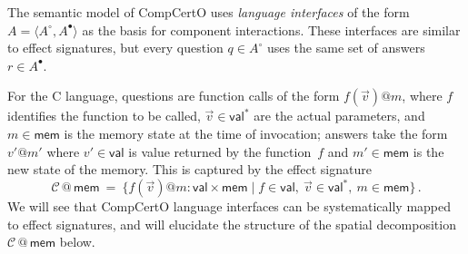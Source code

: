 \documentclass[acmsmall,screen,review,anonymous,nonacm]{acmart}
\newcommand{\kw}[1]{\ensuremath{ \mathsf{#1} }}
\begin{document}
\begin{example} \label{ex:compcertosig} %
The semantic model of CompCertO uses \emph{language interfaces}
of the form $A = \langle A^\circ, A^\bullet \rangle$
as the basis for component interactions.
These interfaces are similar to effect signatures,
but every question $q \in A^\circ$ uses the same set of answers $r \in A^\bullet$.

For the C language,
questions are function calls of the form $f(\vec{v})@m$, where
$f$ identifies the function to be called,
$\vec{v} \in \kw{val}^*$ are the actual parameters, and
$m \in \kw{mem}$ is the memory state at the time of invocation;
answers take the form $v'@m'$ where
$v' \in \kw{val}$ is value returned by the function~$f$ and
$m' \in \kw{mem}$ is the new state of the memory.
This is captured by the effect signature
\[
  \mathcal{C} \mathbin@ \kw{mem} \:=\:
  \{ f(\vec{v})@m \mathbin: \kw{val} \times \kw{mem} \mid
     f \in \kw{val}, \:
     \vec{v} \in \kw{val}^*, \:
     m \in \kw{mem} \}
  \,.
\]
We will see that CompCertO language interfaces
can be systematically mapped to effect signatures,
and will elucidate the structure of
the spatial decomposition $\mathcal{C} \mathbin@ \kw{mem}$ below.
\end{example}

\end{document}
